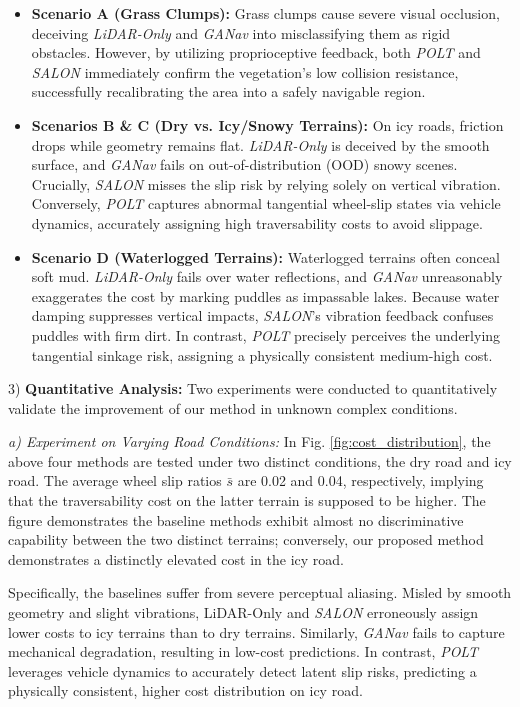 \documentclass[letterpaper, 10 pt, conference]{ieeeconf}  %
\begin{document}
\begin{itemize}
\item \textbf{Scenario A (Grass Clumps):} Grass clumps cause severe visual occlusion, deceiving \textit{LiDAR-Only} and \textit{GANav} into misclassifying them as rigid obstacles. However, by utilizing proprioceptive feedback, both \textit{POLT} and \textit{SALON} immediately confirm the vegetation's low collision resistance, successfully recalibrating the area into a safely navigable region.

\item \textbf{Scenarios B \& C (Dry vs. Icy/Snowy Terrains):} On icy roads, friction drops while geometry remains flat. \textit{LiDAR-Only} is deceived by the smooth surface, and \textit{GANav} fails on out-of-distribution (OOD) snowy scenes. Crucially, \textit{SALON} misses the slip risk by relying solely on vertical vibration. Conversely, \textit{POLT} captures abnormal tangential wheel-slip states via vehicle dynamics, accurately assigning high traversability costs to avoid slippage.

\item \textbf{Scenario D (Waterlogged Terrains):} Waterlogged terrains often conceal soft mud. \textit{LiDAR-Only} fails over water reflections, and \textit{GANav} unreasonably exaggerates the cost by marking puddles as impassable lakes. Because water damping suppresses vertical impacts, \textit{SALON}’s vibration feedback confuses puddles with firm dirt. In contrast, \textit{POLT} precisely perceives the underlying tangential sinkage risk, assigning a physically consistent medium-high cost.
\end{itemize}



3) \textbf{Quantitative Analysis:} Two experiments were conducted to quantitatively validate the improvement of our method in unknown complex conditions.


\textit{a) Experiment on Varying Road Conditions:} In Fig. \ref{fig:cost_distribution}, the above four methods are tested under two distinct conditions, the dry road and icy road. The average wheel slip ratios $\bar{s}$ are 0.02 and 0.04, respectively, implying that the traversability cost on the latter terrain is supposed to be higher. The figure demonstrates the baseline methods exhibit almost no discriminative capability between the two distinct terrains; conversely, our proposed method demonstrates a distinctly elevated cost in the icy road.

Specifically, the baselines suffer from severe perceptual aliasing. Misled by smooth geometry and slight vibrations, LiDAR-Only and \textit{SALON} erroneously assign lower costs to icy terrains than to dry terrains. Similarly, \textit{GANav} fails to capture mechanical degradation, resulting in low-cost predictions. In contrast, \textit{POLT} leverages vehicle dynamics to accurately detect latent slip risks, predicting a physically consistent, higher cost distribution on icy road.
\end{document}

